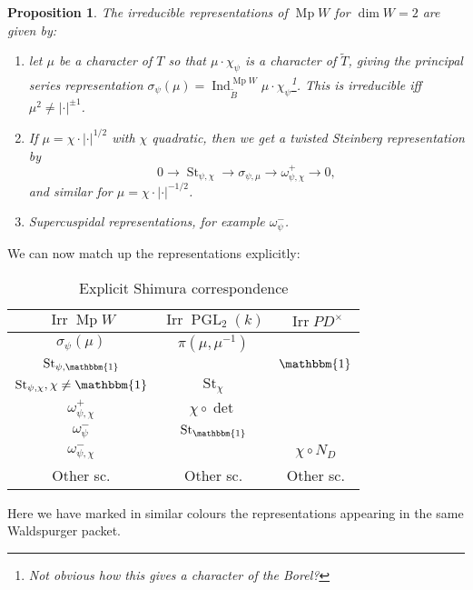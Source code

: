 \documentclass[11pt,a4paper,leqno]{article}
\newcommand{\1}{\mathbbm{1}}
\renewcommand{\tilde}{\widetilde}
\DeclareMathOperator{\Irr}{Irr}
\DeclareMathOperator{\Ind}{Ind}
\DeclareMathOperator{\St}{St}
\DeclareMathOperator{\Mp}{Mp}
\DeclareMathOperator{\PGL}{PGL}
\theoremstyle{plain}
\newtheorem{prop}[theorem]{Proposition}
\theoremstyle{definition}
\theoremstyle{remark}
\numberwithin{equation}{section}
\begin{document}
\begin{prop}
  The irreducible representations of $\Mp W$ for $\dim W = 2$ are
  given by:

  \begin{enumerate}
  \item let $\mu$ be a character of $T$ so that $\mu \cdot \chi_{\psi}$ is a
    character of $\tilde T$, giving the \emph{principal series
      representation} $\sigma_{\psi}(\mu) = \Ind_{\tilde B}^{\Mp
      W} \mu\cdot \chi_{\psi}$\footnote{Not obvious how this gives a character of
      the Borel?}. This is irreducible iff $\mu^{2} \ne |\cdot|^{\pm 1}$. 
  \item If $\mu = \chi \cdot |\cdot |^{1/2}$ with $\chi$ quadratic, then we get a
    \emph{twisted Steinberg representation}  by
    \begin{equation}
      \label{eq:24}
0 \to \St_{\psi,\chi} \to \sigma_{\psi,\mu} \to \omega_{\psi,\chi}^{+}\to 0,
\end{equation}
and similar for $\mu = \chi \cdot |\cdot |^{-1/2}$. 
\item Supercuspidal representations, for example $\omega^{-}_{\psi}$. 
  \end{enumerate}
\end{prop}

We can now match up the representations explicitly:

\begin{table}[h]\label{tab:sh-corr}
  \centering
  \begin{tabular}{c|c|c}
    $\Irr \Mp W$ & $\Irr \PGL_{2}(k)$ & $\Irr PD^{\times}$ \\
    \hline\hline $\sigma_{\psi}(\mu)$& $\pi(\mu,\mu^{-1})$ & \\
    $\St_{\psi,\1}$\cellcolor{skog!25}  & & $\1$\cellcolor{skog!25} \\
    $\St_{\psi,\chi}, \chi \neq \1$\cellcolor{hav!15}  & \cellcolor{hav!15} $\St_{\chi}$ & \\
    $\omega_{\psi,\chi}^{+}$ & $\chi \circ \det$ & \\
    $\omega_{\psi}^{-}$ \cellcolor{skog!25}  & $\St_{\1}$\cellcolor{skog!25} & \\
    $\omega_{\psi,\chi}^{-}$\cellcolor{hav!15}  & & $\chi \circ N_{D}$\cellcolor{hav!15}  \\ 
    Other sc. & Other sc. & Other sc.
  \end{tabular}
  \caption{Explicit Shimura correspondence}
  \label{tab:shimura}
\end{table}
Here we have marked in similar colours the representations appearing
in the same Waldspurger packet.
\end{document}
